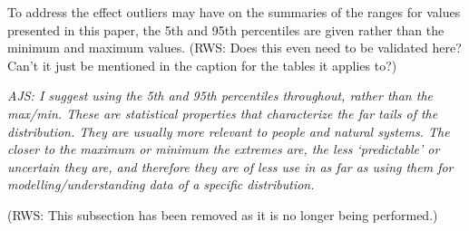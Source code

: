\documentclass{ametsoc}
\begin{document}
To address the effect outliers may have on the summaries of the ranges for values presented in this paper, the 5th and 95th percentiles are given rather than the minimum and maximum values. (RWS: Does this even need to be validated here? Can't it just be mentioned in the caption for the tables it applies to?)


\emph{AJS: I suggest using the 5th and 95th percentiles throughout, rather than the max/min. These are statistical properties that characterize the far tails of the distribution. They are usually more relevant to people and natural systems. The closer to the maximum or minimum the extremes are, the less `predictable' or uncertain they are, and therefore they are of less use in as far as using them for modelling/understanding data of a specific distribution.}

(RWS: This subsection has been removed as it is no longer being performed.)
\end{document}
